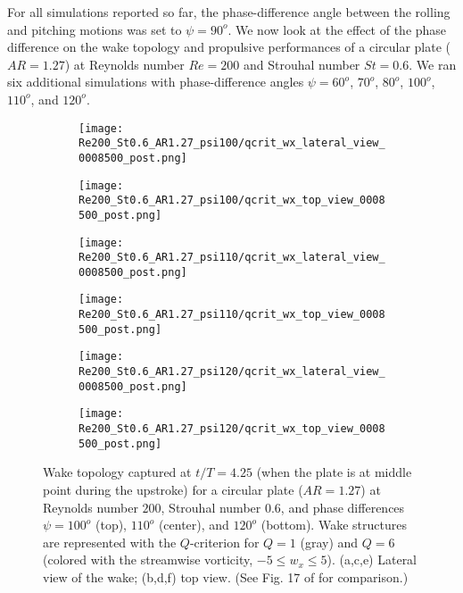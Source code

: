 For all simulations reported so far, the phase-difference angle between the rolling and pitching motions was set to $\psi = 90^o$.
We now look at the effect of the phase difference on the wake topology and propulsive performances of a circular plate ($AR = 1.27$) at Reynolds number $Re = 200$ and Strouhal number $St = 0.6$.
We ran six additional simulations with phase-difference angles $\psi = 60^o$, $70^o$, $80^o$, $100^o$, $110^o$, and $120^o$.

\begin{figure}[!h]
  \centering
  \begin{subfigure}[]{0.45\textwidth}
    \centering
    \texttt{[image: Re200\_St0.6\_AR1.27\_psi100/qcrit\_wx\_lateral\_view\_0008500\_post.png]}
    \caption{}
    \label{fig:phase_wake_topology:100_lateral}
  \end{subfigure}
  \hfill
  \begin{subfigure}[]{0.45\textwidth}
    \centering
    \texttt{[image: Re200\_St0.6\_AR1.27\_psi100/qcrit\_wx\_top\_view\_0008500\_post.png]}
    \caption{}
    \label{fig:phase_wake_topology:100_top}
  \end{subfigure}
  \vspace{1cm}
  \begin{subfigure}[]{0.45\textwidth}
    \centering
    \texttt{[image: Re200\_St0.6\_AR1.27\_psi110/qcrit\_wx\_lateral\_view\_0008500\_post.png]}
    \caption{}
    \label{fig:phase_wake_topology:110_lateral}
  \end{subfigure}
  \hfill
  \begin{subfigure}[]{0.45\textwidth}
    \centering
    \texttt{[image: Re200\_St0.6\_AR1.27\_psi110/qcrit\_wx\_top\_view\_0008500\_post.png]}
    \caption{}
    \label{fig:phase_wake_topology:110_top}
  \end{subfigure}
  \vspace{1cm}
  \begin{subfigure}[]{0.45\textwidth}
    \centering
    \texttt{[image: Re200\_St0.6\_AR1.27\_psi120/qcrit\_wx\_lateral\_view\_0008500\_post.png]}
    \caption{}
    \label{fig:phase_wake_topology:120_lateral}
  \end{subfigure}
  \hfill
  \begin{subfigure}[]{0.45\textwidth}
    \centering
    \texttt{[image: Re200\_St0.6\_AR1.27\_psi120/qcrit\_wx\_top\_view\_0008500\_post.png]}
    \caption{}
    \label{fig:phase_wake_topology:120_top}
  \end{subfigure}
  \caption{Wake topology captured at $t / T = 4.25$ (when the plate is at middle point during the upstroke) for a circular plate ($AR = 1.27$) at Reynolds number $200$, Strouhal number $0.6$, and phase differences $\psi = 100^o$ (top), $110^o$ (center), and $120^o$ (bottom). Wake structures are represented with the $Q$-criterion for $Q = 1$ (gray) and $Q = 6$ (colored with the streamwise vorticity, $-5 \leq w_x \leq 5$). (a,c,e) Lateral view of the wake; (b,d,f) top view. (See Fig. 17 of \citet{li_dong_2016} for comparison.)}
  \label{fig:phase_wake_topology}
\end{figure}

